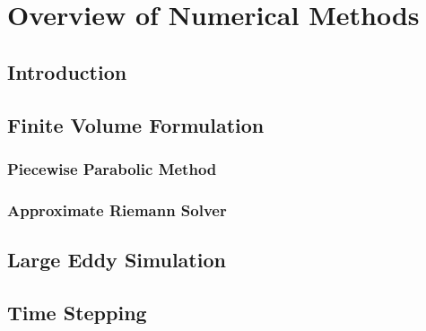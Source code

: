 \chapter{Overview of Numerical Methods}


\section{Introduction}
\section{Finite Volume Formulation}
\subsection{Piecewise Parabolic Method}
\subsection{Approximate Riemann Solver}
\section{Large Eddy Simulation}
\section{Time Stepping}


